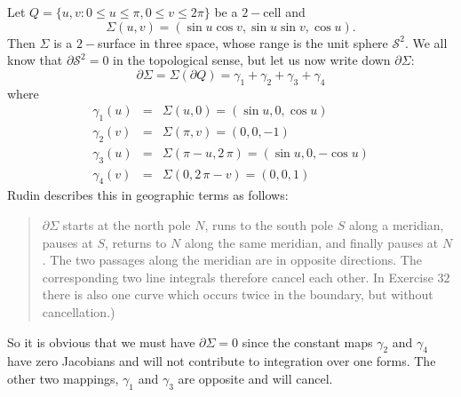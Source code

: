 \documentclass[12pt,a4paper]{article}
\begin{document}
Let $Q=\{u,v: 0\leq u \leq\pi,0\leq v \leq 2\pi\}$ be a $2-$cell and
\begin{displaymath}
\Sigma(u,v) = (\sin u \cos v,\sin u \sin v, \cos u).
\end{displaymath}
Then $\Sigma$ is a $2-$surface in three space, whose range is the unit
sphere $\mathcal{S}^2$. We all know that $\partial\mathcal{S}^2=0$ in
the topological sense, but let us now write down $\partial\Sigma$:
\begin{displaymath}
\partial\Sigma = \Sigma(\partial Q) = \gamma_1+\gamma_2+\gamma_3+\gamma_4
\end{displaymath}
where
\begin{eqnarray*}
\gamma_1(u) &=& \Sigma(u,0) = (\sin u,0,\cos u) \\
\gamma_2(v) &=& \Sigma(\pi,v) = (0,0,-1) \\
\gamma_3(u) &=& \Sigma(\pi-u,2\,\pi) = (\sin u,0,-\cos u) \\
\gamma_4(v) &=& \Sigma(0,2\,\pi-v)=(0,0,1)
\end{eqnarray*}
Rudin describes this in geographic terms as follows:
\begin{verse}
$\partial\Sigma$ starts at the north pole $N$, runs to the
south pole $S$ along a meridian, pauses at $S$, returns to $N$ along the 
same meridian, and finally pauses at $N$. The two passages along the 
meridian are in opposite directions. The corresponding two line integrals 
therefore cancel each other. In Exercise $32$ there is also one curve 
which occurs twice in the boundary, but without cancellation.)
\end{verse}
So it is obvious that we must have $\partial\Sigma = 0$ since the
constant maps $\gamma_2$ and $\gamma_4$ have zero Jacobians and will
not contribute to integration over one forms. The other two mappings,
$\gamma_1$ and $\gamma_3$ are opposite and will cancel.
\end{document}
